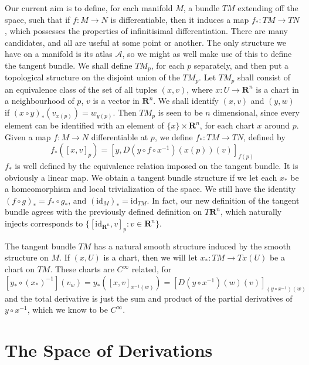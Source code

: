 Our current aim is to define, for each manifold $M$, a bundle $TM$ extending off the space, such that if $f:M \to N$ is differentiable, then it induces a map $f_*:TM \to TN$, which possesses the properties of infinitisimal differentiation. There are many candidates, and all are useful at some point or another. The only structure we have on a manifold is its atlas $\mathcal{A}$, so we might as well make use of this to define the tangent bundle. We shall define $TM_p$, for each $p$ separately, and then put a topological structure on the disjoint union of the $TM_p$. Let $TM_p$ shall consist of an equivalence class of the set of all tuples $(x,v)$, where $x: U \to \mathbf{R}^n$ is a chart in a neighbourhood of $p$, $v$ is a vector in $\mathbf{R}^n$. We shall identify $(x,v)$ and $(y,w)$ if $(x \circ y)_*(v_{x(p)}) = w_{y(p)}$. Then $TM_p$ is seen to be $n$ dimensional, since every element can be identified with an element of $\{ x \} \times \mathbf{R}^n$, for each chart $x$ around $p$. Given a map $f: M \to N$ differentiable at $p$, we define $f_*: TM \to TN$, defined by
%
\[ f_*([x,v]_p) = [y, D(y \circ f \circ x^{-1})(x(p))(v)]_{f(p)} \]
%
$f_*$ is well defined by the equivalence relation imposed on the tangent bundle. It is obviously a linear map. We obtain a tangent bundle structure if we let each $x_*$ be a homeomorphism and local trivialization of the space. We still have the identity $(f \circ g)_* = f_* \circ g_*$, and $(\text{id}_M)_* = \text{id}_{TM}$. In fact, our new definition of the tangent bundle agrees with the previously defined definition on $T\mathbf{R}^n$, which naturally injects corresponds to $\{ [\text{id}_{\mathbf{R}^n}, v]_p : v \in \mathbf{R}^n \}$.

The tangent bundle $TM$ has a natural smooth structure induced by the smooth structure on $M$. If $(x, U)$ is a chart, then we will let $x_*: TM \to Tx(U)$ be a chart on $TM$. These charts are $C^\infty$ related, for
%
\[ [y_* \circ (x_*)^{-1}](v_w) = y_*([x, v]_{x^{-1}(w)}) = \left[ D(y \circ x^{-1})(w)(v) \right]_{(y \circ x^{-1})(w)} \]
%
and the total derivative is just the sum and product of the partial derivatives of $y \circ x^{-1}$, which we know to be $C^\infty$.

\section{The Space of Derivations}

